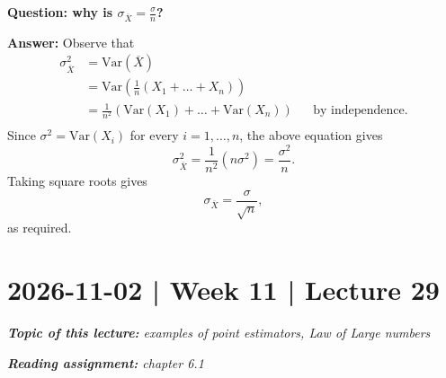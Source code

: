 \documentclass[10pt]{article}
\theoremstyle{definition}
\newcommand{\fl}{\noindent\textbf} %
\newcommand{\1}[1]{\textbf{1}_{\left[#1\right]}} %
\def\Var{\mathrm{Var}} %
\begin{document}
\fl{Question: why is $\sigma_{\overline{X}}=\frac{\sigma}{n}$?}

\fl{Answer:} Observe that
\begin{align*}
  \sigma^{2}_{\overline{X}} 
  &= \Var(\overline{X})\\
  &= \Var \left( \frac{1}{n}(X_{1}+\ldots+X_{n}) \right)\\ 
  &= \frac{1}{n^{2}} \left( \Var(X_{1})+\ldots+\Var(X_{n}) \right)&&\text{by independence.}\\ 
\end{align*}
Since $\sigma^{2}=\Var(X_{i})$ for every $i=1,\ldots,n$, the above equation
gives
\begin{equation*}
  \sigma^{2}_{\overline{X}}= \frac{1}{n^{2}}(n\sigma^{2})=\frac{\sigma^{2}}{n}.
\end{equation*}
Taking square roots gives
\begin{equation*}
  \sigma_{\overline{X}} = \frac{\sigma}{\sqrt{n}},
\end{equation*}
as required.

\newpage
\section{2026-11-02 | Week 11 | Lecture 29}
\begin{center}
  \begin{tcolorbox}[width=0.9\textwidth, colback=white, colframe=black]
    \textit{\textbf{Topic of this lecture:} examples of point estimators, Law
      of Large numbers}

    \textit{\textbf{Reading assignment:} chapter 6.1}
  \end{tcolorbox}
\end{center}
\end{document}

